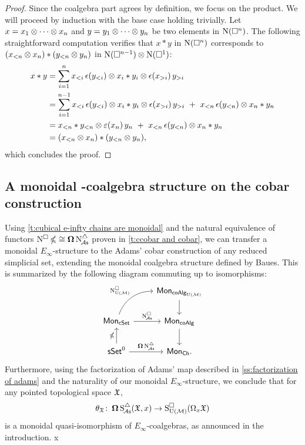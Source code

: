 \begin{proof}
	Since the coalgebra part agrees by definition, we focus on the product.
	We will proceed by induction with the base case holding trivially.
	Let $x = x_1 \otimes \dotsb \otimes x_n$ and $y = y_1 \otimes \dotsb \otimes y_n$ be two elements in $\operatorname{N}(\square^n)$.
	The following straightforward computation verifies that $x \ast y$ in $\operatorname{N}(\square^n)$ corresponds to $(x_{<n} \otimes x_n) \ast (y_{<n} \otimes y_n)$ in $\operatorname{N}(\square^{n-1}) \otimes \operatorname{N}(\square^1)$:
	\begin{align*}
		x \ast y &=
		\sum_{i=1}^n x_{<i}\, \epsilon(y_{<i}) \otimes x_i \ast y_i \otimes \epsilon(x_{>i}) \, y_{>i} \\ &=
		\sum_{i=1}^{n-1} x_{<i}\, \epsilon(y_{<i}) \otimes x_i \ast y_i \otimes \epsilon(x_{>i}) \, y_{>i} \ +\
		x_{<n}\, \epsilon(y_{<n}) \otimes x_n \ast y_n \\ &=
		x_{<n} \ast y_{<n} \otimes \operatorname{\varepsilon}(x_n)\, y_n \ +\ x_{<n}\, \epsilon(y_{<n}) \otimes x_n \ast y_n \\ &=
		(x_{<n} \otimes x_n) \ast (y_{<n} \otimes y_n),
	\end{align*}
	which concludes the proof.
\end{proof}

\subsection{A monoidal \pdfEinfty-coalgebra structure on the cobar construction}\label{ss:e-infty on cobar}

Using \cref{t:cubical e-infty chains are monoidal} and the natural equivalence of functors $\operatorname{N^{\square}} \operatorname{\mathbb{\Omega}} \cong \operatorname{\mathbf{\Omega}} \operatorname{N^{\triangle}_{\!{\mathcal{A}\mathsf{s}}}}$ proven in \cref{t:ccobar and cobar}, we can transfer a monoidal $E_\infty$-structure to the Adams' cobar construction of any reduced simplicial set, extending the monoidal coalgebra structure defined by Baues.
This is summarized by the following diagram commuting up to isomorphisms:
\[
\begin{tikzcd}
	& \Mon_{\coAlg_\UM} \arrow[d] \\
	\Mon_{\cSet} \arrow[ru, "\cchainsUM", out=70, in=180] \arrow[r, "\cchainsA"]
	& \Mon_{\coAlg} \arrow[d] \\
	\sSet^0 \arrow[r, "\cobar \schainsA"] \arrow[u, "\ccobar"]
	& \Mon_{\Ch}.
\end{tikzcd}
\]
Furthermore, using the factorization of Adams' map described in \cref{ss:factorization of adams} and the naturality of our monoidal $E_\infty$-structure, we conclude that for any pointed topological space $\mathfrak{X}$,
\[
\theta_{\mathfrak{X}} \colon \operatorname{\mathbf{\Omega}} \operatorname{S^{\triangle}_{\!{\mathcal{A}\mathsf{s}}}}(\mathfrak{X},x) \to \operatorname{S^{\square}_{{\operatorname{U}(\mathcal{M})}}}(\Omega_x \mathfrak{X})
\]
is a monoidal quasi-isomorphism of $E_{\infty}$-coalgebras, as announced in the introduction.
x